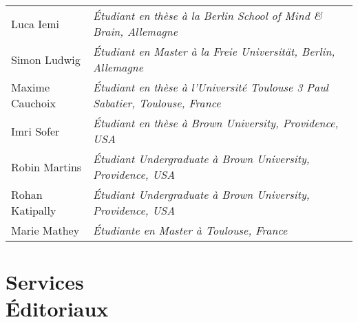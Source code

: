 \documentclass[margin,line]{resume}
\begin{document}
\begin{resume}
	\begin{tabular}{@{}ll} %
	Luca Iemi       & \textsl{\'Etudiant en thèse à la Berlin School of Mind \& Brain, Allemagne}\\
	Simon Ludwig    & \textsl{\'Etudiant en Master à la Freie Universität, Berlin, Allemagne}\\
	Maxime Cauchoix & \textsl{\'Etudiant en thèse à l'Université Toulouse 3 Paul Sabatier, Toulouse, France}\\
	Imri Sofer      & \textsl{\'Etudiant en thèse à Brown University, Providence, USA}\\
	Robin Martins   & \textsl{\'Etudiant Undergraduate à Brown University, Providence, USA} \\
	Rohan Katipally & \textsl{\'Etudiant Undergraduate à Brown University, Providence, USA} \\
	Marie Mathey    & \textsl{\'Etudiante en Master à Toulouse, France}
	\end{tabular}
	




\vspace{3mm}
\section{\mysidestyle Services\\\'Editoriaux}
 

\end{resume}
\end{document}
